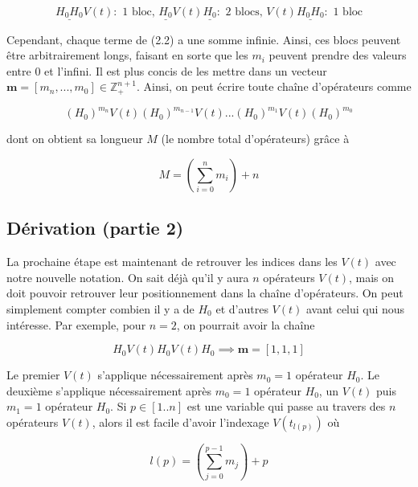 \begin{equation*}
    \underline{H_0H_0}V(t) : \text{ 1 bloc, } \underline{H_0}V(t)\underline{H_0} : \text{ 2 blocs, } V(t)\underline{H_0H_0} : \text{ 1 bloc}
\end{equation*}



Cependant, chaque terme de (2.2) a une somme infinie. Ainsi, ces blocs peuvent être arbitrairement longs, faisant en sorte que les $m_i$ peuvent prendre des valeurs entre 0 et l'infini. Il est plus concis de les mettre dans un vecteur $\boldsymbol{m} = \left[m_n, ..., m_0\right] \in \mathbb{Z}^{n+1}_+$. Ainsi, on peut écrire toute chaîne d'opérateurs comme 

\begin{equation}
    (H_0)^{m_n}V(t)(H_0)^{m_{n-1}}V(t)...(H_0)^{m_1}V(t)(H_0)^{m_0}
\end{equation}

dont on obtient sa longueur $M$ (le nombre total d'opérateurs) grâce à 

\begin{equation}
    M = \left(\sum_{i=0}^{n}m_i\right) + n
\end{equation}

\subsection{Dérivation (partie 2)}
La prochaine étape est maintenant de retrouver les indices dans les $V(t)$ avec notre nouvelle notation. On sait déjà qu'il y aura $n$ opérateurs $V(t)$, mais on doit pouvoir retrouver leur positionnement dans la chaîne d'opérateurs. On peut simplement compter combien il y a de $H_0$ et d'autres $V(t)$ avant celui qui nous intéresse. Par exemple, pour $n=2$, on pourrait avoir la chaîne

\begin{equation*}
    H_0V(t)H_0V(t)H_0 \implies \boldsymbol{m} = \left[1, 1, 1\right]
\end{equation*}

Le premier $V(t)$ s'applique nécessairement après $m_0 = 1$ opérateur $H_0$. Le deuxième s'applique nécessairement après $m_0 = 1$ opérateur $H_0$, un $V(t)$ puis $m_1 = 1$ opérateur $H_0$. Si $p \in \left[1..n\right]$ est une variable qui passe au travers des $n$ opérateurs $V(t)$, alors il est facile d'avoir l'indexage $V(t_{l(p)})$ où

\begin{equation}
    l(p) = \left(\sum_{j=0}^{p-1}m_j\right) + p
\end{equation}


